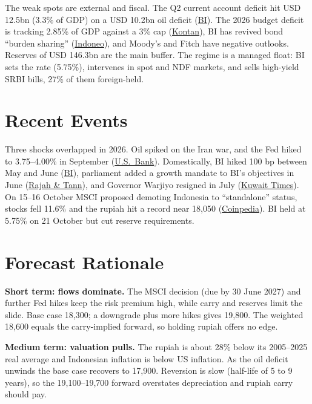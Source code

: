 \documentclass[10pt]{article}
\theoremstyle{plain}\newtheorem{proposition}{Proposition}
\theoremstyle{remark}\newtheorem*{remark}{Remark}
\begin{document}
The weak spots are external and fiscal. The Q2 current account deficit hit USD 12.5bn (3.3\% of GDP) on a USD 10.2bn oil deficit (\href{https://www.bi.go.id/en/publikasi/ruang-media/news-release/Pages/sp_2816526.aspx}{BI}). The 2026 budget deficit is tracking 2.85\% of GDP against a 3\% cap (\href{https://english.kontan.co.id/news/indonesias-2026-budget-deficit-outlook-seen-at-285-of-gdp-house-panel-says}{Kontan}), BI has revived bond ``burden sharing'' (\href{https://www.indoneo.com/capital/indonesia-central-bank-burden-sharing-deficit-breach/}{Indoneo}), and Moody's and Fitch have negative outlooks. Reserves of USD 146.3bn are the main buffer. The regime is a managed float: BI sets the rate (5.75\%), intervenes in spot and NDF markets, and sells high-yield SRBI bills, 27\% of them foreign-held.

\section{Recent Events}
Three shocks overlapped in 2026. Oil spiked on the Iran war, and the Fed hiked to 3.75--4.00\% in September (\href{https://www.usbank.com/investing/financial-perspectives/market-news/federal-reserve-interest-rate.html}{U.S.\ Bank}). Domestically, BI hiked 100 bp between May and June (\href{https://www.bi.go.id/en/publikasi/ruang-media/news-release/Pages/sp_2810726.aspx}{BI}), parliament added a growth mandate to BI's objectives in June (\href{https://www.rajahtannasia.com/?p=193848}{Rajah \& Tann}), and Governor Warjiyo resigned in July (\href{https://kuwaittimes.com/article/49022/business/indonesia-names-new-central-bank-governor/}{Kuwait Times}). On 15--16 October MSCI proposed demoting Indonesia to ``standalone'' status, stocks fell 11.6\% and the rupiah hit a record near 18,050 (\href{https://coinpedia.org/news/indonesia-stocks-crash-11-6-as-msci-threat-sends-rupiah-to-record-low/}{Coinpedia}). BI held at 5.75\% on 21 October but cut reserve requirements.

\section{Forecast Rationale}
\textbf{Short term: flows dominate.} The MSCI decision (due by 30 June 2027) and further Fed hikes keep the risk premium high, while carry and reserves limit the slide. Base case 18,300; a downgrade plus more hikes gives 19,800. The weighted 18,600 equals the carry-implied forward, so holding rupiah offers no edge.

\textbf{Medium term: valuation pulls.} The rupiah is about 28\% below its 2005--2025 real average and Indonesian inflation is below US inflation. As the oil deficit unwinds the base case recovers to 17,900. Reversion is slow (half-life of 5 to 9 years), so the 19,100--19,700 forward overstates depreciation and rupiah carry should pay.
\end{document}
